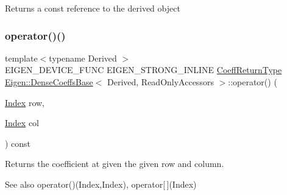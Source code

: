 \begin{DoxyReturn}{Returns}
a const reference to the derived object 
\end{DoxyReturn}
\mbox{\label{class_eigen_1_1_dense_coeffs_base_3_01_derived_00_01_read_only_accessors_01_4_a29ac34389e098ec963ebb2ebd351335a}} 
\subsubsection{\texorpdfstring{operator()()}{operator()()}\hspace{0.1cm}{\footnotesize\ttfamily [1/2]}}
{\footnotesize\ttfamily template$<$typename Derived $>$ \\
E\+I\+G\+E\+N\+\_\+\+D\+E\+V\+I\+C\+E\+\_\+\+F\+U\+NC E\+I\+G\+E\+N\+\_\+\+S\+T\+R\+O\+N\+G\+\_\+\+I\+N\+L\+I\+NE \mbox{\hyperlink{struct_eigen_1_1internal_1_1true__type}{Coeff\+Return\+Type}} \mbox{\hyperlink{class_eigen_1_1_dense_coeffs_base}{Eigen\+::\+Dense\+Coeffs\+Base}}$<$ Derived, Read\+Only\+Accessors $>$\+::operator() (\begin{DoxyParamCaption}\item[{\mbox{\hyperlink{struct_eigen_1_1_eigen_base_a554f30542cc2316add4b1ea0a492ff02}{Index}}}]{row,  }\item[{\mbox{\hyperlink{struct_eigen_1_1_eigen_base_a554f30542cc2316add4b1ea0a492ff02}{Index}}}]{col }\end{DoxyParamCaption}) const\hspace{0.3cm}{\ttfamily [inline]}}

\begin{DoxyReturn}{Returns}
the coefficient at given the given row and column.
\end{DoxyReturn}
\begin{DoxySeeAlso}{See also}
operator()(\+Index,\+Index), operator\mbox{[}$\,$\mbox{]}(\+Index) 
\end{DoxySeeAlso}
\mbox{\label{class_eigen_1_1_dense_coeffs_base_3_01_derived_00_01_read_only_accessors_01_4_a679c7e69917baa1abf2c2f82725ae470}} 
